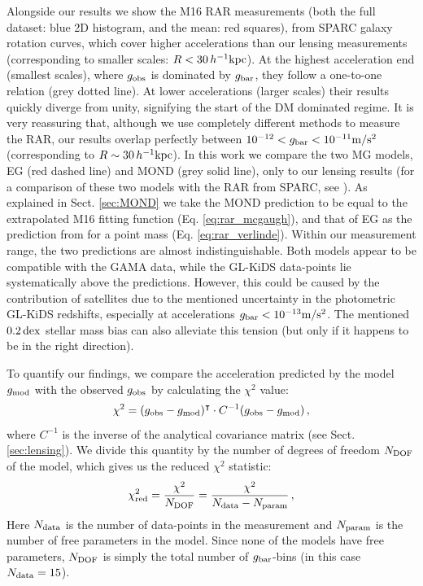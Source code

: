 \documentclass[usenatbib]{mnras}
\newcommand{\hkpc}{\, h^{-1}{\rm{kpc}} }
\newcommand{\mpss}{ {\rm m/s^2} }
\newcommand{\un}[1]{_{\rm #1}}
\newcommand{\dex}{\, {\rm dex}}
\begin{document}
Alongside our results we show the M16 RAR measurements (both the full dataset: blue 2D histogram, and the mean: red squares), from SPARC galaxy rotation curves, which cover higher accelerations than our lensing measurements (corresponding to smaller scales: $R < 30 \hkpc$). At the highest acceleration end (smallest scales), where $g\un{obs}$ is dominated by $g\un{bar}$, they follow a one-to-one relation (grey dotted line). At lower accelerations (larger scales) their results quickly diverge from unity, signifying the start of the DM dominated regime. It is very reassuring that, although we use completely different methods to measure the RAR, our results overlap perfectly between $10^{-12} < g\un{bar} < 10^{-11} \mpss$ (corresponding to $R \sim 30 \hkpc$). In this work we compare the two MG models, EG (red dashed line) and MOND (grey solid line), only to our lensing results (for a comparison of these two models with the RAR from SPARC, see \citealt{lelli2017a}). As explained in Sect. \ref{sec:MOND} we take the MOND prediction to be equal to the extrapolated M16 fitting function (Eq. \ref{eq:rar_mcgaugh}), and that of EG as the prediction from \cite{verlinde2016} for a point mass (Eq. \ref{eq:rar_verlinde}). Within our measurement range, the two predictions are almost indistinguishable. Both models appear to be compatible with the GAMA data, while the GL-KiDS data-points lie systematically above the predictions. However, this could be caused by the contribution of satellites due to the mentioned uncertainty in the photometric GL-KiDS redshifts, especially at accelerations $g\un{bar} < 10^{-13} \mpss$. The mentioned $0.2 \dex$ stellar mass bias can also alleviate this tension (but only if it happens to be in the right direction).

To quantify our findings, we compare the acceleration predicted by the model $g\un{mod}$ with the observed $g\un{obs}$ by calculating the $\chi^2$ value:
\begin{equation}
\chi^2 = (g\un{obs} - g\un{mod})^\intercal \cdot C^{-1}(g\un{obs} - g\un{mod}) \, ,
\label{eq:chi2}
\end{equation}
where $C^{-1}$ is the inverse of the analytical covariance matrix (see Sect. \ref{sec:lensing}). We divide this quantity by the number of degrees of freedom $N\un{DOF}$ of the model, which gives us the reduced $\chi^2$ statistic:
\begin{equation}
\chi\un{red}^2 = \frac{\chi^2}{N\un{DOF}} = \frac{\chi^2}{N\un{data} - N\un{param}} \, ,
\end{equation}
Here $N\un{data}$ is the number of data-points in the measurement and $N\un{param}$ is the number of free parameters in the model. Since none of the models have free parameters, $N\un{DOF}$ is simply the total number of $g\un{bar}$-bins (in this case $N\un{data}= 15$).
\end{document}
